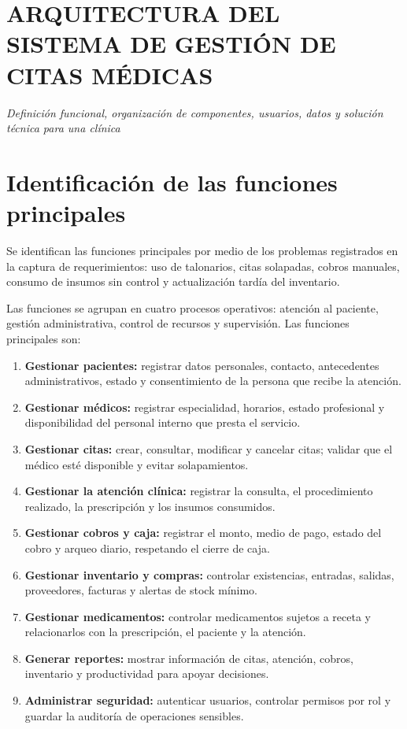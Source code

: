\section*{ARQUITECTURA DEL SISTEMA DE GESTIÓN DE CITAS MÉDICAS}
\begin{center}
\textit{Definición funcional, organización de componentes, usuarios, datos y solución técnica para una clínica}
\end{center}

\section{Identificación de las funciones principales}

 Se identifican las funciones principales por medio de los problemas registrados en la captura de requerimientos: uso de talonarios, citas solapadas, cobros manuales, consumo de insumos sin control y actualización tardía del inventario.

Las funciones se agrupan en cuatro procesos operativos: atención al paciente, gestión administrativa, control de recursos y supervisión. Las funciones principales son:

\begin{enumerate}[label=\textbf{F\arabic*:},leftmargin=2cm]
    \item \textbf{Gestionar pacientes:} registrar datos personales, contacto, antecedentes administrativos, estado y consentimiento de la persona que recibe la atención.
    \item \textbf{Gestionar médicos:} registrar especialidad, horarios, estado profesional y disponibilidad del personal interno que presta el servicio.
    \item \textbf{Gestionar citas:} crear, consultar, modificar y cancelar citas; validar que el médico esté disponible y evitar solapamientos.
    \item \textbf{Gestionar la atención clínica:} registrar la consulta, el procedimiento realizado, la prescripción y los insumos consumidos.
    \item \textbf{Gestionar cobros y caja:} registrar el monto, medio de pago, estado del cobro y arqueo diario, respetando el cierre de caja.
    \item \textbf{Gestionar inventario y compras:} controlar existencias, entradas, salidas, proveedores, facturas y alertas de stock mínimo.
    \item \textbf{Gestionar medicamentos:} controlar medicamentos sujetos a receta y relacionarlos con la prescripción, el paciente y la atención.
    \item \textbf{Generar reportes:} mostrar información de citas, atención, cobros, inventario y productividad para apoyar decisiones.
    \item \textbf{Administrar seguridad:} autenticar usuarios, controlar permisos por rol y guardar la auditoría de operaciones sensibles.
\end{enumerate}

